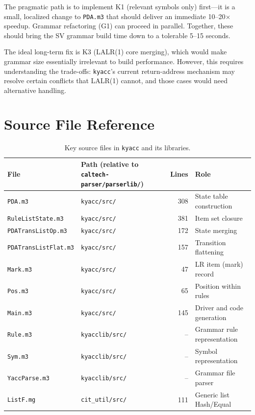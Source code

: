 \documentclass[11pt]{article}
\begin{document}
The pragmatic path is to implement K1 (relevant symbols only)
first---it is a small, localized change to \texttt{PDA.m3} that
should deliver an immediate 10--20$\times$ speedup.  Grammar
refactoring (G1) can proceed in parallel.  Together, these should
bring the SV grammar build time down to a tolerable 5--15 seconds.

The ideal long-term fix is K3 (LALR(1) core merging), which would
make grammar size essentially irrelevant to build performance.
However, this requires understanding the trade-offs: \texttt{kyacc}'s
current return-address mechanism may resolve certain conflicts that
LALR(1) cannot, and those cases would need alternative handling.

\section{Source File Reference}

\begin{table}[h]
\centering
\begin{tabular}{@{}llrl@{}}
\toprule
File & Path (relative to \texttt{caltech-parser/parserlib/}) & Lines & Role \\
\midrule
\texttt{PDA.m3}             & \texttt{kyacc/src/}    & 308 & State table construction \\
\texttt{RuleListState.m3}   & \texttt{kyacc/src/}    & 381 & Item set closure \\
\texttt{PDATransListOp.m3}  & \texttt{kyacc/src/}    & 172 & State merging \\
\texttt{PDATransListFlat.m3}& \texttt{kyacc/src/}    & 157 & Transition flattening \\
\texttt{Mark.m3}            & \texttt{kyacc/src/}    &  47 & LR item (mark) record \\
\texttt{Pos.m3}             & \texttt{kyacc/src/}    &  65 & Position within rules \\
\texttt{Main.m3}            & \texttt{kyacc/src/}    & 145 & Driver and code generation \\
\texttt{Rule.m3}            & \texttt{kyacclib/src/} &  -- & Grammar rule representation \\
\texttt{Sym.m3}             & \texttt{kyacclib/src/} &  -- & Symbol representation \\
\texttt{YaccParse.m3}       & \texttt{kyacclib/src/} &  -- & Grammar file parser \\
\texttt{ListF.mg}           & \texttt{cit\_util/src/} &  111 & Generic list Hash/Equal \\
\bottomrule
\end{tabular}
\caption{Key source files in \texttt{kyacc} and its libraries.}
\end{table}
\end{document}
